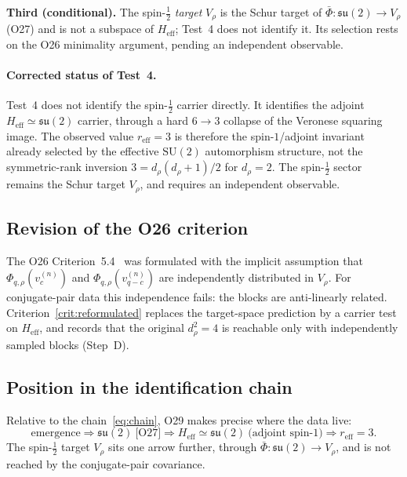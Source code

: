 \documentclass[12pt,a4paper]{article}
\theoremstyle{remark}
\newcommand{\su}{\mathfrak{su}}
\newcommand{\Heff}{H_{\mathrm{eff}}}
\newcommand{\Vrho}{V_{\rho}}
\newcommand{\reff}{r_{\mathrm{eff}}}
\begin{document}
      \textbf{Third (conditional).}
      The spin-$\tfrac{1}{2}$ \emph{target} $\Vrho$ is the Schur target of $\bar\Phi : \su(2) \to \Vrho$ (O27) and is
      not a subspace of $\Heff$; Test~4 does not identify it.
      Its selection rests on the O26 minimality argument, pending an independent observable.

      \paragraph{Corrected status of Test~4.}
      Test~4 does not identify the spin-$\tfrac{1}{2}$ carrier directly.
      It identifies the adjoint $\Heff \simeq \su(2)$ carrier, through a hard $6 \to 3$ collapse of the Veronese
      squaring image.
      The observed value $\reff = 3$ is therefore the spin-$1$/adjoint invariant already selected by the effective
      $\mathrm{SU}(2)$ automorphism structure, not the symmetric-rank inversion $3 = d_\rho(d_\rho+1)/2$ for
      $d_\rho = 2$.
      The spin-$\tfrac{1}{2}$ sector remains the Schur target $V_\rho$, and requires an independent observable.

    \subsection{Revision of the O26 criterion}

      The O26 Criterion~5.4~\cite{Beau2026a30} was formulated with the implicit assumption that
      $\Phi_{q,\rho}(v_c^{(n)})$ and $\Phi_{q,\rho}(v_{q-c}^{(n)})$ are independently distributed in $\Vrho$.
      For conjugate-pair data this independence fails: the blocks are anti-linearly related.
      Criterion~\ref{crit:reformulated} replaces the target-space prediction by a carrier test on $\Heff$, and records
      that the original $d_\rho^2 = 4$ is reachable only with independently sampled blocks (Step~D).

    \subsection{Position in the identification chain}

      Relative to the chain~\eqref{eq:chain}, O29 makes precise where the data live:
      \begin{equation}
        \text{emergence} \Rightarrow \su(2)~\text{[O27]}
        \Rightarrow \Heff \simeq \su(2)~\text{(adjoint spin-$1$)}
        \Rightarrow \reff = 3.
      \end{equation}
      The spin-$\tfrac{1}{2}$ target $\Vrho$ sits one arrow further, through $\bar\Phi : \su(2) \to \Vrho$, and is not
      reached by the conjugate-pair covariance.
\end{document}
